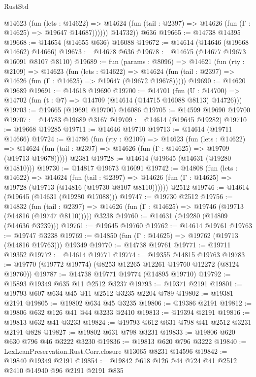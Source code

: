 \begin{lexlean}{RustStd}
\begin{coremodule}
            @14623
              (fun (lets : @14622) =>
              @14624 (fun (tail : @2397) => @14626 (fun (Γ : @14625) => @19647 @14687))))))
        @14732))
    @636
@19665 := @14738 @14395
@19668 := @14654 (@14655 @636) @16088
@19672 := @14614 (@14646 (@19668 @14662) @14666)
@19673 := @14678 @636
@19678 := @14675 (@14677 @19673 @16091 @8107 @8110)
@19689 := fun (params : @8096) =>
  @14621
    (fun (rty : @2109) =>
    @14623
      (fun (lets : @14622) =>
      @14624 (fun (tail : @2397) => @14626 (fun (Γ : @14625) => @19647 (@19672 @19678)))))
@19690 := @14620 @19689
@19691 := @14618 @19690
@19700 := @14701
    (fun (U : @14700) => @14702 (fun (t : @7) => @14709 (@14614 (@14715 @16088 @8113) @14726)))
@19703 := @19665 (@19691 @19700) @16086
@19705 := @14599 @19690 @19700
@19707 := @14783 @19689 @3167
@19709 := @14614 (@19645 @19282)
@19710 := @19668 @19285
@19711 := @14646 @19710
@19713 := @14614 (@19711 @14666)
@19724 := @14786
    (fun (rty : @2109) =>
    @14623
      (fun (lets : @14622) =>
      @14624 (fun (tail : @2397) => @14626 (fun (Γ : @14625) => @19709 (@19713 @19678)))))
    @2381
@19728 := @14614 (@19645 (@14631 (@19280 @14810)))
@19730 := @14817 @19673 @16091
@19742 := @14808
    (fun (lets : @14622) =>
    @14624
      (fun (tail : @2397) =>
      @14626 (fun (Γ : @14625) => @19728 (@19713 (@14816 (@19730 @8107 @8110))))))
    @2512
@19746 := @14614 (@19645 (@14631 (@19280 @17088)))
@19747 := @19730 @2512
@19756 := @14832
    (fun (tail : @2397) => @14626 (fun (Γ : @14625) => @19746 (@19713 (@14816 (@19747 @8110)))))
    @3238
@19760 := @14631 (@19280 (@14809 (@14636 @3239)))
@19761 := @19645 @19760
@19762 := @14614 @19761
@19763 := @19747 @3238
@19769 := @14850 (fun (Γ : @14625) => @19762 (@19713 (@14816 @19763))) @19349
@19770 := @14738 @19761
@19771 := @19711 @19352
@19772 := @14614 @19771
@19774 := @19355 @14815 @19763
@19783 := @19770 (@19772 @19774) (@8253 @12265 @12261 @19760 @12272 (@8124 @19760))
@19787 := @14738 @19771 @19774 (@14895 @19710)
@19792 := @15893 @19349 @635 @11 @2512 @3237
@19793 := @19371 @2191
@19801 := @19793 @607 @634 @45 @11 @2512 @3235 @2204 @789
@19802 := @19381 @2191
@19805 := @19802 @634 @45 @3235
@19806 := @19386 @2191
@19812 := @19806 @632 @126 @41 @44 @3233 @2410
@19813 := @19394 @2191
@19816 := @19813 @632 @41 @3233
@19824 := @19793 @612 @631 @798 @41 @2512 @3231 @2191 @828
@19827 := @19802 @631 @798 @3231
@19833 := @19806 @620 @630 @796 @46 @3222 @3230
@19836 := @19813 @620 @796 @3222
@19840 := LexLeanPreservation.Rust.Corr.closure @13065 @8231 @14596
@19842 := @19840 @19349 @2191
@19854 := @19842 @618 @126 @44 @724 @41 @2512 @2410 @14940 @96 @2191 @2191 @835

\end{coremodule}
\end{lexlean}
